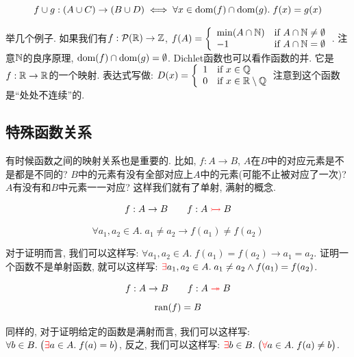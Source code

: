 \begin{theorem}
    {\[
      f \cup g: (A \cup C) \to (B \cup D) \iff
      \forall x \in \text{dom}(f) \cap \text{dom}(g).\; f(x) = g(x)
    \]}
\end{theorem}

举几个例子. 如果我们有$f: \mathcal{P}(\mathbb{R}) \to \mathbb{Z}$, $f(A) = \left\{\begin{array}{ll}
    \min(A \cap \mathbb{N}) & \text{if } A \cap \mathbb{N} \neq \emptyset \\
      -1 & \text{if } A \cap \mathbb{N} = \emptyset
  \end{array}\right.$. 
注意$\mathbb{N}$的良序原理, $\text{dom}{(f)}\cap \text{dom}{(g)}=\emptyset$. Dichlet函数也可以看作函数的并. 它是$f:\mathbb{R} \to \mathbb{R}$的一个映射. 表达式写做: $D(x) = \left\{\begin{array}{ll}
    1 & \text{if } x \in \mathbb{Q} \\
    0 & \text{if } x \in \mathbb{R} \setminus \mathbb{Q}
\end{array}\right.$注意到这个函数是``处处不连续''的. 

\subsection{特殊函数关系}

有时候函数之间的映射关系也是重要的. 比如, $f:A\to B$, $A$在$B$中的对应元素是不是都是不同的? $B$中的元素有没有全部对应上$A$中的元素(可能不止被对应了一次)? $A$有没有和$B$中元素一一对应? 这样我们就有了单射, 满射的概念. 

\begin{definition}
    \[
      f: A \to B \qquad {f: A \textcolor{red}{\;\rightarrowtail\;} B}
    \]

    \[
      \forall a_1, a_2 \in A.\; a_1 \neq a_2 \to f(a_1) \neq f(a_2)
    \]
\end{definition}

对于证明而言, 我们可以这样写: $\forall a_1, a_2 \in A.\; f(a_1) = f(a_2) \to a_1 = a_2$. 证明一个函数不是单射函数, 就可以这样写: $\textcolor{red}{\exists} a_1, a_2 \in A.\; a_1 \neq a_2 \land f(a_1) = f(a_2)$. 

\begin{definition}
    \[
      f: A \to B \qquad {f: A \textcolor{red}{\;\twoheadrightarrow\;} B}
    \]
    \[
      \text{ran}(f) = B
    \]
\end{definition}

同样的, 对于证明给定的函数是满射而言, 我们可以这样写: $\forall b \in B. \; \big(\textcolor{red}{\exists} a \in A.\; f(a) = b \big)$, 反之, 我们可以这样写: $\textcolor{red}{\exists} b \in B.\; \big(\textcolor{red}{\forall} a \in A.\; f(a) \neq b \big)$. 

